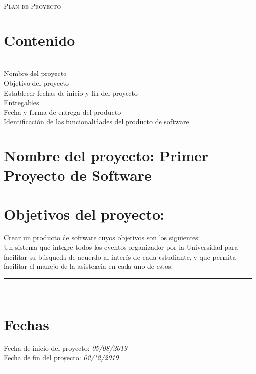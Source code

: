 \documentclass{article}
\newcommand\fecha[3]{\textit{#1/#2/#3}}
\begin{document}

\marginsize{2cm}{2cm}{1cm}{5cm} 

\begin{center}
  {\LARGE \scshape Plan de Proyecto\vspace{10mm} }
\end{center}

\section{Contenido}
\\
Nombre del proyecto\\
\indent Objetivo del proyecto\\
\indent Establecer fechas de inicio y fin del proyecto\\
\indent Entregables\\
\indent Fecha y forma de entrega del producto\\
\indent Identificación de las funcionalidades del producto de software
\newpage


\section{Nombre del proyecto: Primer Proyecto de Software}
\section{Objetivos del proyecto:}
Crear un producto de software cuyos objetivos son los siguientes:\\
Un sistema que integre todos los eventos organizador por la Universidad para
facilitar su búsqueda de acuerdo al interés de cada estudiante, y que permita
facilitar el manejo de la asistencia en cada uno de estos.\\
\rule{1\textwidth}{.8pt}\\

\section{Fechas}
Fecha de inicio del proyecto:\hspace{.64cm} \fecha{05}{08}{2019}\\
\indent Fecha de fin del proyecto: \hspace{1cm}\fecha{02}{12}{2019}\\
\rule{1\textwidth}{.8pt}\\
\end{document}

